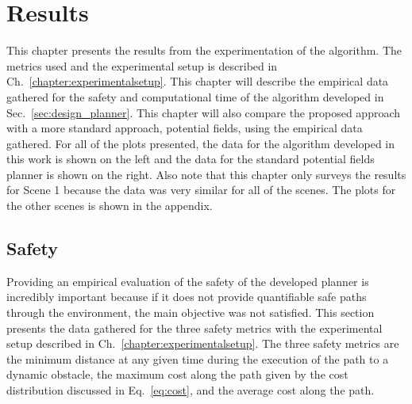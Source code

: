 


\chapter{Results}

\label{chapter:results}

This chapter presents the results from the experimentation of the algorithm.
The metrics used and the experimental setup is described in
Ch.~\ref{chapter:experimentalsetup}. This chapter will describe the empirical
data gathered for the safety and computational time of the algorithm developed
in Sec.~\ref{sec:design_planner}. This chapter will also compare the proposed
approach with a more standard approach, potential fields, using the empirical
data gathered. For all of the plots presented, the data for the algorithm
developed in this work is shown on the left and the data for the standard
potential fields planner is shown on the right. Also note that this chapter
only surveys the results for Scene 1 because the data was very similar for all
of the scenes. The plots for the other scenes is shown in the appendix.

\section{Safety}

Providing an empirical evaluation of the safety of the developed planner is
incredibly important because if it does not provide quantifiable safe paths
through the environment, the main objective was not satisfied. This section
presents the data gathered for the three safety metrics with the experimental
setup described in Ch.~\ref{chapter:experimentalsetup}. The three safety
metrics are the minimum distance at any given time during the execution of the
path to a dynamic obstacle, the maximum cost along the path given by the cost
distribution discussed in Eq.~\ref{eq:cost}, and the average cost along the
path.

